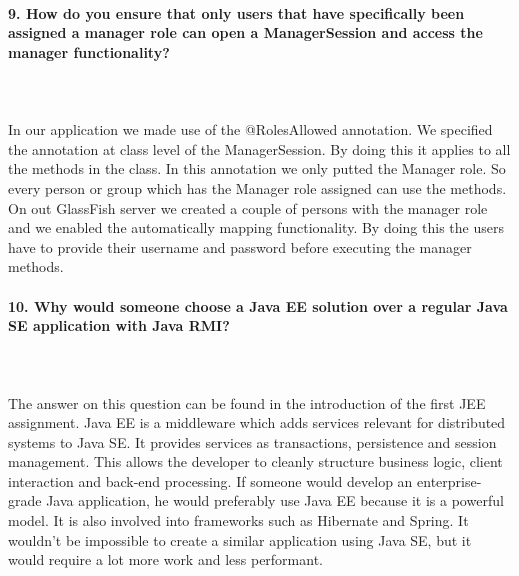 \documentclass{ds-report}
\begin{document}
	\paragraph{9. How do you ensure that only users that have specifically been assigned a manager role can open a ManagerSession and access the manager functionality?} \mbox{}\\\\
In our application we made use of the @RolesAllowed annotation. We specified the annotation at class level of the ManagerSession. By doing this it applies to all the methods in the class. In this annotation we only putted the Manager role. So every person or group which has the Manager role assigned can use the methods.
On out GlassFish server we created a couple of persons with the manager role and we enabled the automatically mapping functionality. By doing this the users have to provide their username and password before executing the manager methods. 
	
	
	\paragraph{10.  Why would someone choose a Java EE solution over a regular Java SE application with Java RMI?} \mbox{}\\\\
The answer on this question can be found in the introduction of the first JEE assignment. Java EE is a middleware which adds services relevant for distributed systems to Java SE. It provides services as transactions, persistence and session management. This allows the developer to cleanly structure business logic, client interaction and back-end processing.
If someone would develop an enterprise-grade Java application, he would preferably use Java EE because it is a powerful model. It is also involved into frameworks such as Hibernate and Spring. It wouldn't be impossible to create a similar application using Java SE, but it would require a lot more work and less performant. 


	
	\clearpage

	
\end{document}
